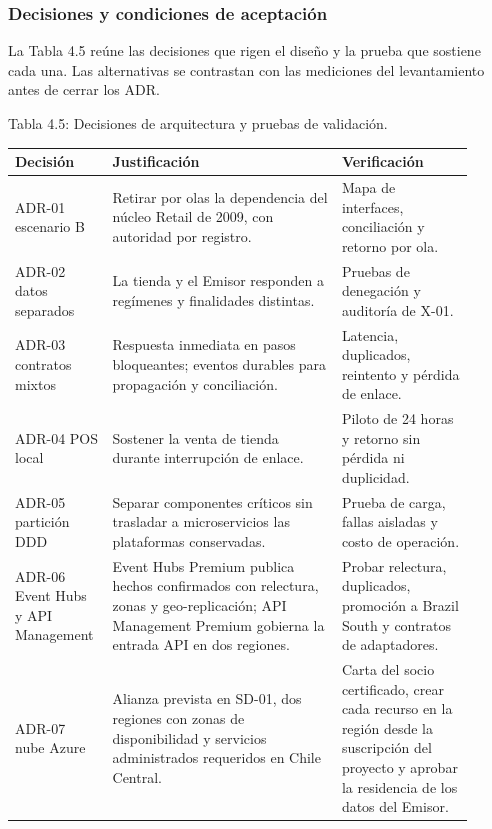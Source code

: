 \documentclass[11pt]{article}
\begin{document}
\subsubsection{Decisiones y condiciones de aceptación}

La Tabla 4.5 reúne las decisiones que rigen el diseño y la prueba que sostiene cada una. Las alternativas se contrastan con las mediciones del levantamiento antes de cerrar los ADR.

\par\vspace{0pt plus 10\baselineskip}\vspace{0pt plus -10\baselineskip}

Tabla 4.5: Decisiones de arquitectura y pruebas de validación.\par\nopagebreak
\begin{longtable}{@{}p{0.17\linewidth}p{0.47\linewidth}p{0.27\linewidth}@{}}
\toprule Decisión & Justificación & Verificación \\
\midrule\endhead\bottomrule\endlastfoot
ADR-01 escenario B & Retirar por olas la dependencia del núcleo Retail de 2009, con autoridad por registro. & Mapa de interfaces, conciliación y retorno por ola. \\
ADR-02 datos separados & La tienda y el Emisor responden a regímenes y finalidades distintas. & Pruebas de denegación y auditoría de X-01. \\
ADR-03 contratos mixtos & Respuesta inmediata en pasos bloqueantes; eventos durables para propagación y conciliación. & Latencia, duplicados, reintento y pérdida de enlace. \\
ADR-04 POS local & Sostener la venta de tienda durante interrupción de enlace. & Piloto de 24 horas y retorno sin pérdida ni duplicidad. \\
ADR-05 partición DDD & Separar componentes críticos sin trasladar a microservicios las plataformas conservadas. & Prueba de carga, fallas aisladas y costo de operación. \\
ADR-06 Event Hubs y API Management & Event Hubs Premium publica hechos confirmados con relectura, zonas y geo-replicación; API Management Premium gobierna la entrada API en dos regiones. & Probar relectura, duplicados, promoción a Brazil South y contratos de adaptadores. \\
ADR-07 nube Azure & Alianza prevista en SD-01, dos regiones con zonas de disponibilidad y servicios administrados requeridos en Chile Central. & Carta del socio certificado, crear cada recurso en la región desde la suscripción del proyecto y aprobar la residencia de los datos del Emisor. \\
\end{longtable}
\end{document}

